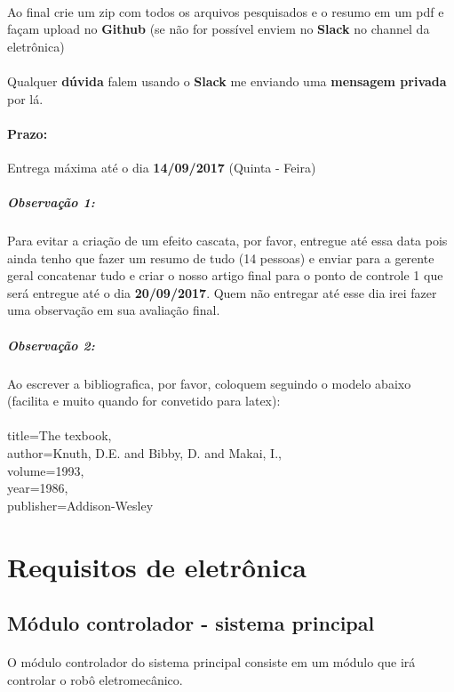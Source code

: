\documentclass[a4paper]{article}
\begin{document}
\paragraph{} Ao final crie um zip com todos os arquivos pesquisados e o resumo em um pdf e façam upload no \textbf{Github} (se não for possível enviem no \textbf{Slack} no channel da eletrônica)

\paragraph{} Qualquer \textbf{dúvida} falem usando o \textbf{Slack} me enviando uma \textbf{mensagem privada} por lá.

\paragraph{Prazo:} Entrega máxima até o dia \textbf{14/09/2017} (Quinta - Feira)

\subparagraph{Observação 1:} Para evitar a criação de um efeito cascata, por favor, entregue até essa data pois ainda tenho que fazer um resumo de tudo (14 pessoas) e enviar para a gerente geral concatenar tudo e criar o nosso artigo final para o ponto de controle 1 que será entregue até o dia \textbf{20/09/2017}. Quem não entregar até esse dia irei fazer uma observação em sua avaliação final.

\subparagraph{Observação 2:} Ao escrever a bibliografica, por favor, coloquem seguindo o modelo abaixo (facilita e muito quando for convetido para latex):\\
\\
  title={The texbook},\\
  author={Knuth, D.E. and Bibby, D. and Makai, I.},\\
  volume={1993},\\
  year={1986},\\
  publisher={Addison-Wesley}

 
\section{Requisitos de eletrônica}
\subsection{Módulo controlador - sistema principal}
\paragraph{} O módulo controlador do sistema principal consiste em um módulo que irá controlar o robô eletromecânico.
\end{document}
